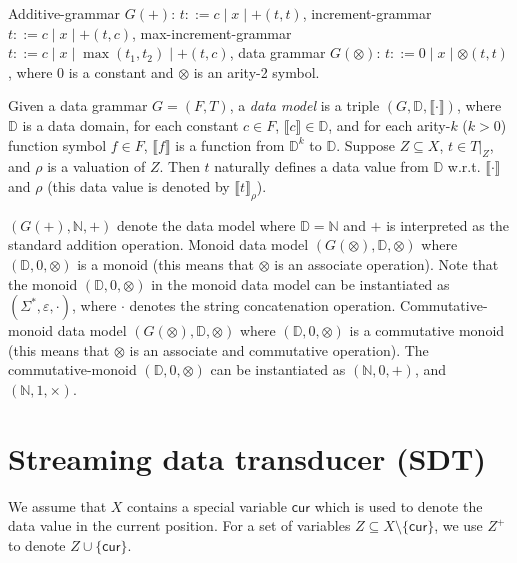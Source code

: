 \documentclass[runningheads,a4paper]{llncs}
\newcommand{\eval}[2]{\llbracket#1\rrbracket_{#2}}
\newcommand\cur{\mathsf{cur}}
\newcommand\dd{\mathbb{D}}
\newcommand\nat{\mathbb{N}}
\begin{document}
\begin{example}
Additive-grammar $G(+)$: $t ::= c \mid x \mid +(t,t)$, increment-grammar $t ::= c \mid x \mid +(t,c)$, max-increment-grammar $t ::= c \mid x \mid \max(t_1, t_2) \mid +(t,c)$, data grammar $G(\otimes)$: $t ::= 0 \mid x \mid \otimes(t,t)$, where $0$ is a constant and $\otimes$ is an arity-2 symbol. 
\end{example}

Given a data grammar $G=(F, T)$, a \emph{data model} is a triple $(G, \dd, \llbracket \cdot \rrbracket)$, where $\dd$ is a data domain,  for each constant $c \in F$, $\llbracket c\rrbracket \in \dd$, and for each arity-$k$ ($k > 0$) function symbol $f \in F$, $\llbracket f \rrbracket $ is a function from $\dd^k$ to $\dd$. Suppose $Z \subseteq X$, $t \in T|_Z$, and $\rho$ is a valuation of $Z$. Then $t$ naturally defines a data value from $\dd$ w.r.t. $\llbracket \cdot \rrbracket$ and $\rho$ (this data value is denoted by $\eval{t}{\rho}$).


\begin{example}
$(G(+), \nat, +)$ denote the data model where $\dd=\nat$ and $+$ is interpreted as the standard addition operation. Monoid data model $(G(\otimes), \dd, \otimes)$ where $(\dd, 0, \otimes)$ is a monoid (this means that $\otimes$ is an associate operation). Note that the monoid $(\dd, 0, \otimes)$ in the monoid data model can be instantiated as $(\Sigma^\ast, \varepsilon, \cdot)$, where $\cdot$ denotes the string concatenation operation. Commutative-monoid data model $(G(\otimes), \dd, \otimes)$ where $(\dd, 0, \otimes)$ is a commutative monoid (this means that $\otimes$ is an associate and commutative operation). The commutative-monoid  $(\dd, 0, \otimes)$ can be instantiated as $(\nat, 0, +)$, and $(\nat, 1, \times)$. 
\end{example}
 
\section{Streaming data transducer (SDT)}

We assume that $X$ contains a special variable $\cur$ which is used to denote the data value in the current position. For a set of variables $Z \subseteq X \setminus \{\cur\}$, we use $Z^+$ to denote $Z \cup \{\cur\}$.
\end{document}
